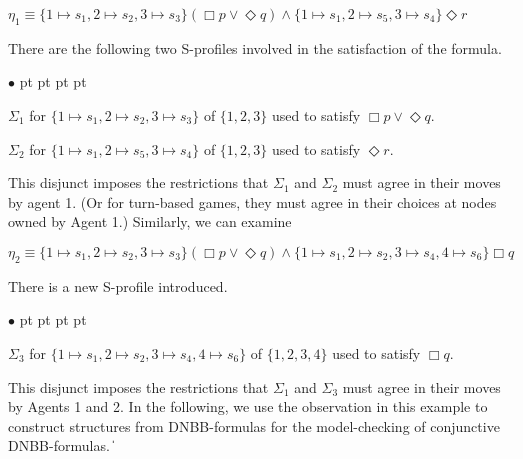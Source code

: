 \documentclass[11pt]{article}
\newcommand{\pfrr}{\Box}
\newcommand{\pevt}{\Diamond}
\def\qed{\ifmmode\|\else{\unskip\nobreak\hfil
\penalty50\hskip1em\null\nobreak\hfil$\blacksquare$
\parfillskip=0pt\finalhyphendemerits=0\endgraf}\fi}
\newenvironment{list1}{\begin{list}{$\bullet$}
{\topsep 0 pt \parsep 0 pt \partopsep 0 pt \itemsep 0 pt}}{\end{list}}
\begin{document}
\begin{center}
$\eta_1\equiv \{1\mapsto s_1,2\mapsto s_2,3\mapsto s_3\}(
	    \pfrr p\vee \pevt q
	    )\wedge \{1\mapsto s_1, 2\mapsto s_5,3\mapsto s_4\}
	    \pevt r$
\end{center}
There are the following
two S-profiles involved in the satisfaction of the formula.
\begin{list1}
\item $\Sigma_1$ for $\{1\mapsto s_1,2\mapsto s_2,3\mapsto s_3\}$ 
	of $\{1,2,3\}$ 
	used to satisfy $\pfrr p\vee \pevt q$.
\item $\Sigma_2$ for  $\{1\mapsto s_1, 2\mapsto s_5,3\mapsto s_4\}$ 
	of $\{1,2,3\}$ used to satisfy $\pevt r$.
\end{list1}
This disjunct imposes the restrictions that 
$\Sigma_1$ and $\Sigma_2$ must agree in their moves by agent 1.  
(Or for turn-based games, they must agree in their choices at nodes
owned by Agent 1.)  
Similarly, we can examine 
\begin{center}
$\eta_2\equiv \{1\mapsto s_1,2\mapsto s_2,3\mapsto s_3\}(
	    \pfrr p\vee \pevt q
	    )\wedge  
	  \{1\mapsto s_1,2\mapsto s_2,3\mapsto s_4, 4\mapsto s_6\}
	     \pfrr q$
\end{center}
There is a new S-profile introduced. 
\begin{list1}
\item $\Sigma_3$ for  $\{1\mapsto s_1,2\mapsto s_2,3\mapsto s_4, 4\mapsto s_6\}$ 
	of $\{1,2,3,4\}$ used to satisfy $\pfrr q$.
\end{list1}
This disjunct imposes the restrictions that 
$\Sigma_1$ and $\Sigma_3$ must agree in their moves by Agents 1 and 2.
In the following, we use the observation in this example to
construct structures from DNBB-formulas for the model-checking
of conjunctive DNBB-formulas.
\qed
\end{document}
